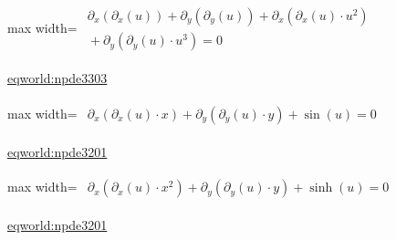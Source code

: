 \documentclass[10pt,a4paper]{article}
\begin{document}
\begin{minipage}{\linewidth}
\begin{center}\begin{adjustbox}{max width=\linewidth}$\displaystyle\begin{gathered}\begin{gathered}\partial_{x}(\partial_{x}(u))+\partial_{y}(\partial_{y}(u))+\partial_{x}(\partial_{x}(u)\cdot u^{2})\\[-1pt]{}+\partial_{y}(\partial_{y}(u)\cdot u^{3})=0\end{gathered}\end{gathered}$\end{adjustbox}\end{center}
{\small \href{https://eqworld.ipmnet.ru/en/solutions/npde/npde3303.pdf}{eqworld:npde3303}}\par
\end{minipage}\par\vspace{7mm}

\begin{minipage}{\linewidth}
\begin{center}\begin{adjustbox}{max width=\linewidth}$\displaystyle\begin{gathered}\begin{gathered}\partial_{x}(\partial_{x}(u)\cdot x)+\partial_{y}(\partial_{y}(u)\cdot y)+\sin(u)=0\end{gathered}\end{gathered}$\end{adjustbox}\end{center}
{\small \href{https://eqworld.ipmnet.ru/en/solutions/npde/npde3201.pdf}{eqworld:npde3201}}\par
\end{minipage}\par\vspace{7mm}

\begin{minipage}{\linewidth}
\begin{center}\begin{adjustbox}{max width=\linewidth}$\displaystyle\begin{gathered}\begin{gathered}\partial_{x}(\partial_{x}(u)\cdot x^{2})+\partial_{y}(\partial_{y}(u)\cdot y)+\sinh(u)=0\end{gathered}\end{gathered}$\end{adjustbox}\end{center}
{\small \href{https://eqworld.ipmnet.ru/en/solutions/npde/npde3201.pdf}{eqworld:npde3201}}\par
\end{minipage}\par\vspace{7mm}
\end{document}
